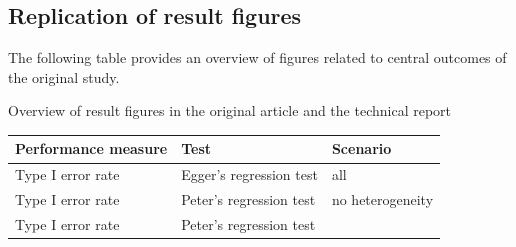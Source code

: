 \documentclass[
  english,
  doc,floatsintext,draftall]{apa6}
\begin{document}
\hypertarget{replication-of-result-figures}{%
\subsection{Replication of result figures}\label{replication-of-result-figures}}

The following table provides an overview of figures related to central outcomes of the original study.

Overview of result figures in the original article and the technical report

\begin{longtable}[]{@{}lll@{}}
\toprule
\begin{minipage}[b]{0.30\columnwidth}\raggedright
Performance measure\strut
\end{minipage} & \begin{minipage}[b]{0.30\columnwidth}\raggedright
Test\strut
\end{minipage} & \begin{minipage}[b]{0.30\columnwidth}\raggedright
Scenario\strut
\end{minipage}\tabularnewline
\midrule
\endhead
\begin{minipage}[t]{0.30\columnwidth}\raggedright
Type I error rate\strut
\end{minipage} & \begin{minipage}[t]{0.30\columnwidth}\raggedright
Egger's regression test\strut
\end{minipage} & \begin{minipage}[t]{0.30\columnwidth}\raggedright
all\strut
\end{minipage}\tabularnewline
\begin{minipage}[t]{0.30\columnwidth}\raggedright
Type I error rate\strut
\end{minipage} & \begin{minipage}[t]{0.30\columnwidth}\raggedright
Peter's regression test\strut
\end{minipage} & \begin{minipage}[t]{0.30\columnwidth}\raggedright
no heterogeneity\strut
\end{minipage}\tabularnewline
\begin{minipage}[t]{0.30\columnwidth}\raggedright
Type I error rate\strut
\end{minipage} & \begin{minipage}[t]{0.30\columnwidth}\raggedright
Peter's regression test\strut
\end{minipage} & \begin{minipage}[t]{0.30\columnwidth}\raggedright

\end{minipage}
\end{longtable}
\end{document}

